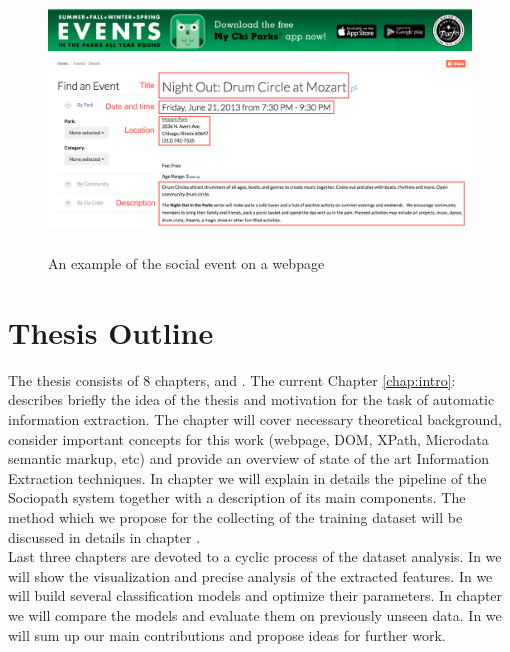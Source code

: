 \begin{figure}[h]
\begin{center}
\includegraphics[height=7cm]{figures01/event_example}
\caption{An example of the social event on a webpage}
\label{fig:webevent}
\end{center}
\end{figure}




\section{Thesis Outline}
The thesis consists of 8 chapters,  and . 
The current Chapter \ref{chap:intro}:  describes briefly the idea of the thesis and motivation for the task of automatic information extraction. The chapter  will cover necessary theoretical background, consider important concepts for this work (webpage, DOM, XPath, Microdata semantic markup, etc) and provide an overview of state of the art Information Extraction techniques. In chapter  we will explain in details the pipeline of the Sociopath system together with a description of its main components. The method which we propose for the collecting of the training dataset will be discussed in details in chapter . \\

Last three chapters are devoted to a cyclic process of the dataset analysis. In  we will show the visualization and precise analysis of the extracted features. In  we will build several classification models and optimize their parameters. In chapter  we will compare the models and evaluate them on previously unseen data. In  we will sum up our main contributions and propose ideas for further work.